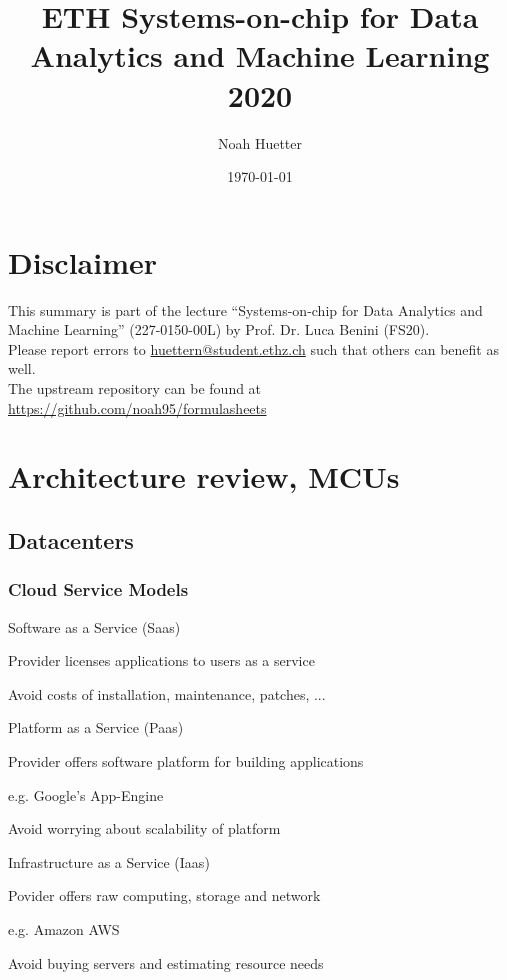 \documentclass[a4paper, fontsize=8pt, landscape, DIV=1]{scrartcl}
\title{ETH Systems-on-chip for Data Analytics and Machine Learning 2020}
\author{Noah Huetter}
\date{\today}
\makeatletter
\renewenvironment{outline}[1][]{%
  \ifthenelse{\equal{#1}{}}{}{\renewcommand{\ol@type}{#1}}%
  \ol@z%
  \newcommand{\0}{\ol@toz\ol@z}%
  \newcommand{\1}{\vspace{\dimexpr\outlinespacingscalar\baselineskip-\baselineskip}\ol@toi\ol@i\item}%
  \newcommand{\2}{\vspace{\dimexpr\outlinespacingscalartwo\baselineskip-\baselineskip}\ol@toii\ol@ii\item}%
  \newcommand{\3}{\vspace{\dimexpr\outlinespacingscalar\baselineskip-\baselineskip}\ol@toiii\ol@iii\item}%
  \newcommand{\4}{\vspace{\dimexpr\outlinespacingscalar\baselineskip-\baselineskip}\ol@toiiii\ol@iiii\item}%
}{%
  \ol@toz\ol@exit%
}
\def\outlinespacingscalar{0.5}
\def\outlinespacingscalartwo{0.5}
\makeatother
\begin{document}
\setcounter{page}{0}
\setcounter{secnumdepth}{2} %
\begin{multicols*}{4}
	\section*{Disclaimer}
	This summary is part of the lecture ``Systems-on-chip for Data Analytics and Machine Learning'' (227-0150-00L) by Prof. Dr. Luca Benini (FS20). \\[6pt]
	Please report errors to \href{mailto:huettern@student.ethz.ch}{huettern@student.ethz.ch} such that others can benefit as well.\\[6pt]	
  The upstream repository can be found at \href{https://github.com/noah95/formulasheets}{https://github.com/noah95/formulasheets}
	\vfill\null
  \columnbreak
  \setcounter{tocdepth}{2}
  \tableofcontents
  \vfill\null
	\pagebreak
  \maketitle 
  \setcounter{page}{1}
  \thispagestyle{fancy}

  \section{Architecture review, MCUs}
  \subsection{Datacenters}
  \subsubsection{Cloud Service Models}
  \begin{outline}
    \1 Software as a Service (Saas)
      \2 Provider licenses applications to users as a service
      \2 Avoid costs of installation, maintenance, patches, ...
    \1 Platform as a Service (Paas)
      \2 Provider offers software platform for building applications
      \2 e.g. Google's App-Engine
      \2 Avoid worrying about scalability of platform
    \1 Infrastructure as a Service (Iaas)
      \2 Povider offers raw computing, storage and network
      \2 e.g. Amazon AWS
      \2 Avoid buying servers and estimating resource needs
  \end{outline}


\end{multicols*}
\end{document}
